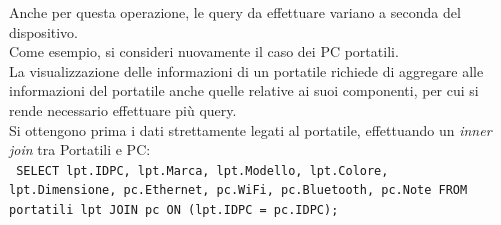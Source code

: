 \documentclass[a4paper,12pt]{report}
\begin{document}
Anche per questa operazione, le query da effettuare variano a seconda del dispositivo. \\
\noindent Come esempio, si consideri nuovamente il caso dei PC portatili. \\

La visualizzazione delle informazioni di un portatile richiede di aggregare alle informazioni del portatile anche quelle relative ai suoi componenti, per cui si rende necessario effettuare più query. \\

\noindent Si ottengono prima i dati strettamente legati al portatile, effettuando un \textit{inner join} tra Portatili e PC: \\
\texttt{
SELECT lpt.IDPC, lpt.Marca, lpt.Modello, lpt.Colore, \\
lpt.Dimensione, pc.Ethernet, pc.WiFi, pc.Bluetooth, pc.Note
FROM portatili lpt JOIN pc ON (lpt.IDPC = pc.IDPC);
} \\
\end{document}
